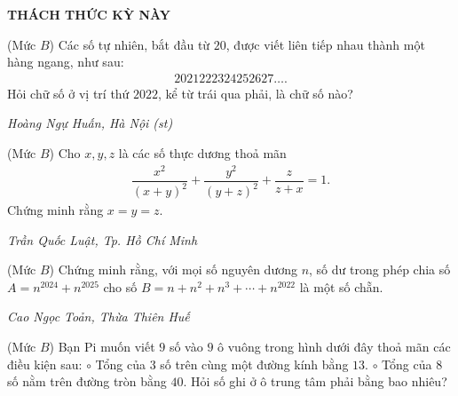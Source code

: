 \begin{center}
	\vspace*{-5pt}
	\textbf{\color{thachthuctoanhoc}\color{thachthuctoanhoc}THÁCH THỨC KỲ NÀY}
	\vspace*{-5pt}
\end{center}
\begin{multicols}{2}
	\setlength{\abovedisplayskip}{4pt}
	\setlength{\belowdisplayskip}{4pt}
	{}
	(Mức $B$) Các số tự nhiên, bắt đầu từ $20$, được viết liên tiếp nhau thành một hàng ngang, như sau:
	\begin{align*}
		2021222324252627\ldots.
	\end{align*}
	Hỏi chữ số ở vị trí thứ $2022$, kể từ trái qua phải, là chữ số nào?
	\begin{flushright}
		\textit{Hoàng Ngự Huấn, Hà Nội (st)}
	\end{flushright}
	{}
	(Mức $B$) Cho $x,y,z$ là các số thực dương thoả mãn 
	\begin{align*}
		\dfrac{x^2}{(x+y)^2}+\dfrac{y^2}{(y+z)^2}+\dfrac z{z+x}=1.
	\end{align*}
	Chứng minh rằng $x=y=z$. 
	\begin{flushright}
		\textit{Trần Quốc Luật, Tp. Hồ Chí Minh}
	\end{flushright}
	{}
	(Mức $B$) Chứng minh rằng, với mọi số nguyên dương $n$, số dư trong phép chia số $A=n^{2024}+n^{2025}$  cho số $B=n+n^2+n^3+\cdots+n^{2022}$ là một số chẵn. 
	\begin{flushright}
		\textit{Cao Ngọc Toản, Thừa Thiên Huế}
	\end{flushright}
	{}
	(Mức $B$) Bạn Pi muốn viết $9$ số vào $9$ ô vuông trong hình dưới đây thoả mãn các điều kiện sau: 
	\vskip 0.05cm
	$\circ$ Tổng của $3$ số trên cùng một đường kính bằng $13$.
	\vskip 0.05cm
	$\circ$ Tổng của $8$ số nằm trên đường tròn bằng $40$. 
	\vskip 0.05cm
	Hỏi số ghi ở ô trung tâm phải bằng bao nhiêu?
	\begin{figure}[H]
		\centering
		\vspace*{-5pt}
		\captionsetup{labelformat= empty, justification=centering}

\end{figure}
\end{multicols}
